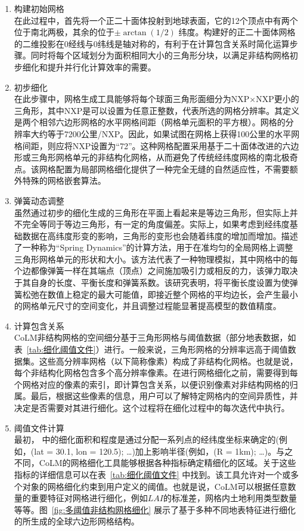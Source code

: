 \begin{enumerate}
\item 构建初始网格\\
在此过程中，首先将一个正二十面体投射到地球表面，它的12个顶点中有两个位于南北两极，其余的位于$\pm\arctan(1/2)$ 纬度。构建好的正二十面体网格的二维投影在0\textdegree 经线与0\textdegree 纬线是轴对称的，有利于在计算包含关系时简化运算步骤。同时将每个区域划分为面积相同大小的三角形分块，以满足非结构网格初步细化和提升并行化计算效率的需要。
\item 初步细化\\
在此步骤中，网格生成工具能够将每个球面三角形面细分为NXP×NXP更小的三角形，其中NXP是可以设置为任意正整数，代表所选的网格分辨率。其定义是两个相邻六边形网格的水平网格间距（网格单元面积的平方根）。网格的分辨率大约等于7200公里/NXP。因此，如果试图在网格上获得100公里的水平网格间距，则应将NXP设置为“72”。这种网格配置采用基于二十面体改进的六边形或三角形网格单元的非结构化网格，从而避免了传统经纬度网格的南北极奇点。该网格配置为局部网格细化提供了一种完全无缝的自然适应性，不需要额外特殊的网格嵌套算法。
\item 弹簧动态调整\\
虽然通过初步的细化生成的三角形在平面上看起来是等边三角形，但实际上并不完全等同于等边三角形，有一定的角度偏差。实际上，如果考虑到经纬度基础数据在高纬度形变的影响，三角形的变形也会随着纬度的增加而增加。\citet{tomita2002optimization}描述了一种称为“Spring Dynamics”的计算方法，用于在准均匀的全局网格上调整三角形网格单元的形状和大小。该方法代表了一种物理模拟，其中网格中的每个边都像弹簧一样在其端点（顶点）之间施加吸引力或相反的力，该弹力取决于其自身的长度、平衡长度和弹簧系数。该研究表明，将平衡长度设置为使弹簧松弛在数值上稳定的最大可能值，即接近整个网格的平均边长，会产生最小的网格单元尺寸的空间变化，并且调整过程能显著提高模型的数值精度。
\item 计算包含关系 \\
CoLM非结构网格的空间细分基于三角形网格与阈值数据（部分地表数据，如表~\ref{tab:细化阈值文件}）进行。一般来说，三角形网格的分辨率远高于阈值数据集。这些高分辨率网格（以下简称像素）构成了非结构化网格。也就是说，每个非结构化网格包含多个高分辨率像素。在进行网格细化之前，需要得到每个网格对应的像素的索引，即计算包含关系，以便识别像素对非结构网格的归属。最后，根据这些像素的信息，用户可以了解特定网格内的空间异质性，并决定是否需要对其进行细化。这个过程将在细化过程中的每次迭代中执行。
\item 阈值文件计算\\
最初，\citet{walko_direct_2011} 中的细化面积和程度是通过分配一系列点的经纬度坐标来确定的(例如，(lat = 30.1, lon = 120.5); \dots)加上影响半径(例如，(R = 1km); \dots)。与之不同，CoLM的网格细化工具能够根据各种指标确定精细化的区域。关于这些指标的详细信息可以在表~\ref{tab:细化阈值文件} 中找到。该工具允许对一个或多个对象的网格细化约束到用户定义的阈值。也就是说，CoLM可以根据任意数量的重要特征对网格进行细化，例如$LAI$的标准差，网格内土地利用类型数量等等。图~\ref{fig:多阈值非结构网格细化} 展示了基于多种不同地表特征进行细化的所生成的全球六边形网格结构。

\end{enumerate}
